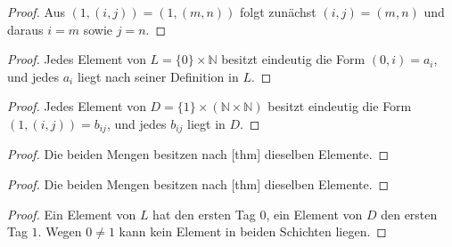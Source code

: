 \documentclass[main.tex]{subfiles}
\begin{document}
\begin{proof}
Aus \((1,(i,j))=(1,(m,n))\) folgt zunächst \((i,j)=(m,n)\) und daraus
\(i=m\) sowie \(j=n\).
\end{proof}

\begin{proof}
Jedes Element von \(L=\{0\}\times\mathbb N\) besitzt eindeutig die Form
\((0,i)=a_i\), und jedes \(a_i\) liegt nach seiner Definition in \(L\).
\end{proof}

\begin{proof}
Jedes Element von
\(D=\{1\}\times(\mathbb N\times\mathbb N)\) besitzt eindeutig die Form
\((1,(i,j))=b_{ij}\), und jedes \(b_{ij}\) liegt in \(D\).
\end{proof}

\begin{proof}
Die beiden Mengen besitzen nach
[thm] dieselben Elemente.
\end{proof}

\begin{proof}
Die beiden Mengen besitzen nach
[thm] dieselben Elemente.
\end{proof}

\begin{proof}
Ein Element von \(L\) hat den ersten Tag \(0\), ein Element von \(D\) den
ersten Tag \(1\). Wegen \(0\neq1\) kann kein Element in beiden Schichten
liegen.
\end{proof}
\end{document}
